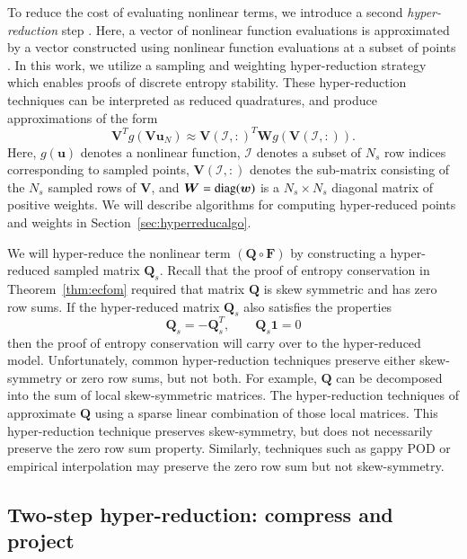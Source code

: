 \documentclass[preprint,10pt]{elsarticle}
\theoremstyle{definition}
\theoremstyle{lemma}
\theoremstyle{theorem}
\theoremstyle{assumption}
\newcommand{\LRp}[1]{\left( #1 \right)}
\begin{document}
To reduce the cost of evaluating nonlinear terms, we introduce a second \textit{hyper-reduction} step \cite{ryckelynck2009hyper}.  Here, a vector of nonlinear function evaluations is approximated by a vector constructed using nonlinear function evaluations at a subset of points \cite{barrault2004empirical, bui2004aerodynamic, chaturantabut2010nonlinear, farhat2015structure, drmac2016new, hernandez2017dimensional, yano2019lp}.  In this work, we utilize a sampling and weighting hyper-reduction strategy \cite{farhat2015structure, hernandez2017dimensional, yano2019lp} which enables proofs of discrete entropy stability.  These hyper-reduction techniques can be interpreted as reduced quadratures, and produce approximations of the form
\[
\bm{V}^Tg(\bm{V}\bm{u}_N) \approx \bm{V}\LRp{\mathcal{I},:}^T \bm{W} g\LRp{\bm{V}\LRp{\mathcal{I},:}}.
\]
Here, $g(\bm{u})$ denotes a nonlinear function, $\mathcal{I}$ denotes a subset of $N_s$ row indices corresponding to sampled points, $\bm{V}\LRp{\mathcal{I},:}$ denotes the sub-matrix consisting of the $N_s$ sampled rows of $\bm{V}$, and $\bm{W} = {\rm diag}(\bm{w})$ is a $N_s\times N_s$ diagonal matrix of positive weights.  We will describe algorithms for computing hyper-reduced points and weights in Section~\ref{sec:hyperreducalgo}.

We will hyper-reduce the nonlinear term $\LRp{\bm{Q}\circ \bm{F}}$ by constructing a hyper-reduced sampled matrix $\bm{Q}_s$.  Recall that the proof of entropy conservation in Theorem~\ref{thm:ecfom} required that matrix $\bm{Q}$ is skew symmetric and has zero row sums.  If the hyper-reduced matrix $\bm{Q}_s$ also satisfies the properties
\[
\bm{Q}_s = -\bm{Q}_s^T, \qquad \bm{Q}_s\bm{1} = 0
\]
then the proof of entropy conservation will carry over to the hyper-reduced model.  Unfortunately, common hyper-reduction techniques preserve either skew-symmetry or zero row sums, but not both.  For example, $\bm{Q}$ can be decomposed into the sum of local skew-symmetric matrices.  The hyper-reduction techniques of \cite{farhat2015structure, yano2019discontinuous} approximate $\bm{Q}$ using a sparse linear combination of those local matrices.  This hyper-reduction technique preserves skew-symmetry, but does not necessarily preserve the zero row sum property.  Similarly, techniques such as gappy POD or empirical interpolation \cite{everson1995karhunen, barrault2004empirical, chaturantabut2010nonlinear} may preserve the zero row sum but not skew-symmetry.  

\subsection{Two-step hyper-reduction: compress and project}
\end{document}
